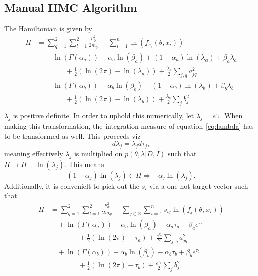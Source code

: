 \documentclass[a4paper,11pt, oneside]{article}
\theoremstyle{definition}
\begin{document}
	\subsection{Manual HMC Algorithm}
	The Hamiltonian is given by
	\begin{equation}
		\begin{split}
			H&=\sum_{q=1}^{2}\sum_{l=1}^{2}\frac{p_{ql}^2}{2m_{ql}}-\sum_{i=1}^{n}\ln(f_{s_i}(\theta,x_i))\\
				&\quad+\ln(\Gamma(\alpha_a))-\alpha_a\ln(\beta_a)+(1-\alpha_a)\ln(\lambda_a)+\beta_a\lambda_a\\
				&\qquad \qquad+\frac{1}{2}(\ln(2\pi)-\ln(\lambda_a))+\frac{\lambda_a}{2}\sum_{j,q}a_{jq}^2\\
				&\quad+\ln(\Gamma(\alpha_b))-\alpha_b\ln(\beta_b)+(1-\alpha_b)\ln(\lambda_b)+\beta_b\lambda_b\\
				&\qquad \qquad+\frac{1}{2}(\ln(2\pi)-\ln(\lambda_b))+\frac{\lambda_b}{2}\sum_{j}b_j^2\\
			\end{split}
	\end{equation}
	$\lambda_j$ is positive definite. In order to uphold this numerically, let $\lambda_j = e^{\tau_j}$. When making this transformation, the integration measure of equation \eqref{eq:lambda} has to be transformed as well. This proceeds viz
	\begin{equation}
		d\lambda_j = \lambda_jd\tau_j,
	\end{equation}
	meaning effectively $\lambda_j$ is multiplied on $p(\theta,\lambda|D,I)$ such that $H \rightarrow H-\ln(\lambda_j)$. This means
	\begin{equation}
		(1-\alpha_j)\ln(\lambda_j)\in H \Rightarrow -\alpha_j \ln(\lambda_j).
	\end{equation}
	Additionally, it is convenielt to pick out the $s_i$ via a one-hot target vector such that
	\begin{equation}
		\begin{split}
			H&=\sum_{q=1}^{2}\sum_{l=1}^{2}\frac{p_{ql}^2}{2m_{ql}}-\sum_{j\in \mathbb{S}}\sum_{i=1}^{n}s_{ij}\ln(f_{j}(\theta,x_i))\\
			&\quad+\ln(\Gamma(\alpha_a))-\alpha_a\ln(\beta_a)-\alpha_a\tau_a+\beta_ae^{\tau_a}\\
			&\qquad \qquad+\frac{1}{2}(\ln(2\pi)-\tau_a)+\frac{e^{\tau_a}}{2}\sum_{j,q}a_{jq}^2\\
			&\quad+\ln(\Gamma(\alpha_b))-\alpha_b\ln(\beta_b)-\alpha_b\tau_b+\beta_be^{\tau_b}\\
			&\qquad \qquad+\frac{1}{2}(\ln(2\pi)-\tau_b)+\frac{e^{\tau_b}}{2}\sum_{j}b_j^2\\
		\end{split}
	\end{equation}
\end{document}
